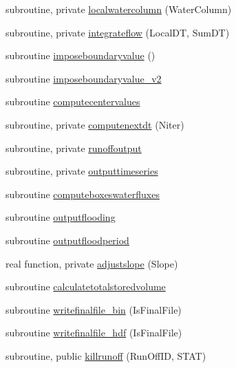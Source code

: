 \begin{DoxyCompactItemize}
subroutine, private \mbox{\hyperlink{namespacemodulerunoff_abd7df3c244fbd0c4171c796df0f50906}{localwatercolumn}} (Water\+Column)
\item 
subroutine, private \mbox{\hyperlink{namespacemodulerunoff_ad94c220c4dbba10ee5046785e9e782e9}{integrateflow}} (Local\+DT, Sum\+DT)
\item 
subroutine \mbox{\hyperlink{namespacemodulerunoff_a994fa95e6648fa412fa3e0982c2953e3}{imposeboundaryvalue}} ()
\item 
subroutine \mbox{\hyperlink{namespacemodulerunoff_acf9771f898b15e849b1eaba077dd0d83}{imposeboundaryvalue\+\_\+v2}}
\item 
subroutine \mbox{\hyperlink{namespacemodulerunoff_a922ce27a6758e75221357b9572099e5a}{computecentervalues}}
\item 
subroutine, private \mbox{\hyperlink{namespacemodulerunoff_a7e93c436177a4089e806a4f1fdeedc77}{computenextdt}} (Niter)
\item 
subroutine, private \mbox{\hyperlink{namespacemodulerunoff_af0c6bd2433c33b62204214405fa2bd23}{runoffoutput}}
\item 
subroutine, private \mbox{\hyperlink{namespacemodulerunoff_aaf5ac22ae6531f74c06c4596a878eaf9}{outputtimeseries}}
\item 
subroutine \mbox{\hyperlink{namespacemodulerunoff_a88ccc0aaa3ecf729db168b684f5b4801}{computeboxeswaterfluxes}}
\item 
subroutine \mbox{\hyperlink{namespacemodulerunoff_a61882209b1d8802763f9fb32a5f34a38}{outputflooding}}
\item 
subroutine \mbox{\hyperlink{namespacemodulerunoff_ad52912e124d2d30970fdc6d5bd8c15cc}{outputfloodperiod}}
\item 
real function, private \mbox{\hyperlink{namespacemodulerunoff_a5ac5c14875a2f0f2791e37f40b4321ea}{adjustslope}} (Slope)
\item 
subroutine \mbox{\hyperlink{namespacemodulerunoff_a341a4c8ef2509bc0f144f8afd17ece22}{calculatetotalstoredvolume}}
\item 
subroutine \mbox{\hyperlink{namespacemodulerunoff_a2f27139bf5cc235ef3e04522e63d2f5d}{writefinalfile\+\_\+bin}} (Is\+Final\+File)
\item 
subroutine \mbox{\hyperlink{namespacemodulerunoff_af0a5f9cb46a0d94efdb301f1b582b7c4}{writefinalfile\+\_\+hdf}} (Is\+Final\+File)
\item 
subroutine, public \mbox{\hyperlink{namespacemodulerunoff_aa17d0391187f304ab3410eb5d26a4711}{killrunoff}} (Run\+Off\+ID, S\+T\+AT)
\item 

\end{DoxyCompactItemize}
